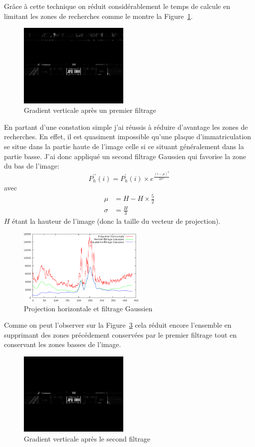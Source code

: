 \documentclass[a4paper,10pt,twocolumn]{article}
\begin{document}
Grâce à cette technique on réduit considérablement le temps de calcule en limitant les zones de recherches comme le montre la Figure~\ref{v_filter}.
\begin{figure}[H]
	\centering 
	  \includegraphics[width=200px]{img/991213-006_v_filter_1-2.png}
	\caption{Gradient verticale après un premier filtrage\label{v_filter}}
\end{figure}
En partant d'une constation simple j'ai réussis à réduire d'avantage les zones de recherches. En effet, il est quasiment impossible qu'une plaque d'immatriculation se situe dans la partie haute de l'image celle si ce situant généralement dans la partie basse. J'ai donc appliqué un second filtrage Gaussien qui favorise la zone du bas de l'image:
\begin{equation}
  P_h^{\prime\prime}(i) = P_h^{\prime}(i) \times e^{\frac{(i - \mu)^2}{2\sigma^2}}
\end{equation}
avec 
\begin{align*}
  \mu & = H - H\times \frac{5}{2}\\
  \sigma & = \frac{H}{3}
\end{align*}
$H$ étant la hauteur de l'image (donc la taille du vecteur de projection).

\begin{figure}[H]
	\centering 
	  \includegraphics[width=230px]{img/project_h_gauss.png}
	\caption{Projection horizontale et filtrage Gaussien\label{h_proj_gauss}}
\end{figure}

Comme on peut l'observer sur la Figure~\ref{v_filter_gauss} cela réduit encore l'ensemble en supprimant des zones précédement conservées par le premier filtrage tout en conservant les zones basses de l'image.
\begin{figure}[H]
	\centering 
	  \includegraphics[width=200px]{img/991213-006_v_filter_gauss.png}
	\caption{Gradient verticale après le second filtrage\label{v_filter_gauss}}
\end{figure}
\end{document}
